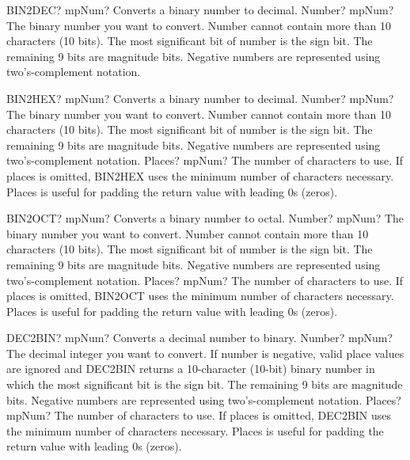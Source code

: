 \documentclass[12pt,a4paper,openany]{book}
\begin{document}
\begin{mpFunctionsExtract}
\mpWorksheetFunctionOneNotImplemented
{BIN2DEC? mpNum? Converts a binary number to decimal.}
{Number? mpNum? The binary number you want to convert. Number cannot contain more than 10 characters (10 bits). The most significant bit of number is the sign bit. The remaining 9 bits are magnitude bits. Negative numbers are represented using two's-complement notation.}
\end{mpFunctionsExtract}

\begin{mpFunctionsExtract}
\mpWorksheetFunctionTwoNotImplemented
{BIN2HEX? mpNum? Converts a binary number to decimal.}
{Number? mpNum? The binary number you want to convert. Number cannot contain more than 10 characters (10 bits). The most significant bit of number is the sign bit. The remaining 9 bits are magnitude bits. Negative numbers are represented using two's-complement notation.}
{Places? mpNum? The number of characters to use. If places is omitted, BIN2HEX uses the minimum number of characters necessary. Places is useful for padding the return value with leading 0s (zeros).}
\end{mpFunctionsExtract}

\begin{mpFunctionsExtract}
\mpWorksheetFunctionTwoNotImplemented
{BIN2OCT? mpNum? Converts a binary number to octal.}
{Number? mpNum? The binary number you want to convert. Number cannot contain more than 10 characters (10 bits). The most significant bit of number is the sign bit. The remaining 9 bits are magnitude bits. Negative numbers are represented using two's-complement notation.}
{Places? mpNum? The number of characters to use. If places is omitted, BIN2OCT uses the minimum number of characters necessary. Places is useful for padding the return value with leading 0s (zeros).}
\end{mpFunctionsExtract}

\begin{mpFunctionsExtract}
\mpWorksheetFunctionTwoNotImplemented
{DEC2BIN? mpNum? Converts a decimal number to binary.}
{Number? mpNum? The decimal integer you want to convert. If number is negative, valid place values are ignored and DEC2BIN returns a 10-character (10-bit) binary number in which the most significant bit is the sign bit. The remaining 9 bits are magnitude bits. Negative numbers are represented using two's-complement notation.}
{Places? mpNum? The number of characters to use. If places is omitted, DEC2BIN uses the minimum number of characters necessary. Places is useful for padding the return value with leading 0s (zeros).}
\end{mpFunctionsExtract}
\end{document}
